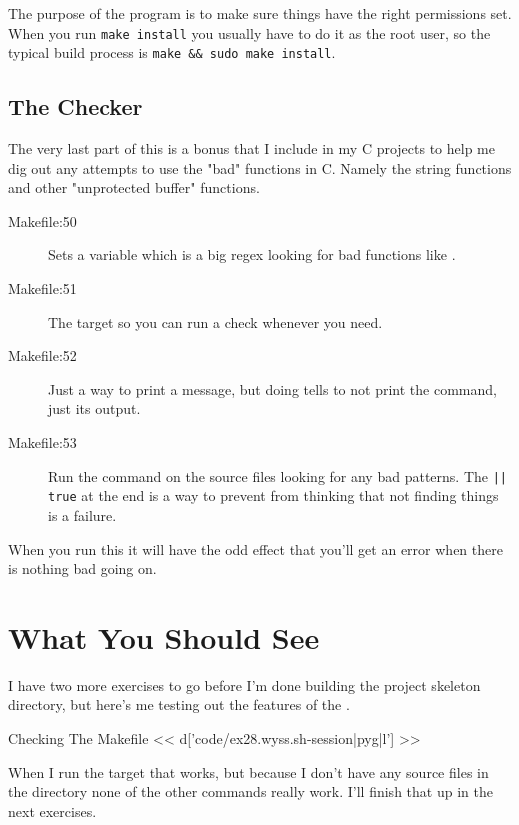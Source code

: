 The purpose of the  program is to make sure things have the 
right permissions set.  When you run \verb|make install| you usually have to
do it as the root user, so the typical build process is \verb|make && sudo make install|.

\subsection{The Checker}

The very last part of this  is a bonus that I include in my 
C projects to help me dig out any attempts to use the "bad" functions in C.
Namely the string functions and other "unprotected buffer" functions.

\begin{description}
\item[Makefile:50] Sets a variable which is a big regex looking for bad
    functions like .
\item[Makefile:51] The  target so you can run a check whenever
     you need.
\item[Makefile:52] Just a way to print a message, but doing  tells
     to not print the command, just its output.
\item[Makefile:53] Run the  command on the source files
    looking for any bad patterns.  The \verb,|| true, at the end is a way
    to prevent  from thinking that  not finding
    things is a failure.
\end{description}

When you run this it will have the odd effect that you'll get an error when there
is nothing bad going on.

\section{What You Should See}

I have two more exercises to go before I'm done building the project skeleton
directory, but here's me testing out the features of the .

\begin{code}{Checking The Makefile}
<< d['code/ex28.wyss.sh-session|pyg|l'] >>
\end{code}

When I run the  target that works, but because I don't have
any source files in the  directory none of the other commands
really work.  I'll finish that up in the next exercises.

